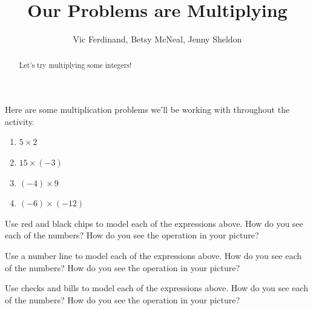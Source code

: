 \documentclass[nooutcomes,noauthor,handout]{ximera}
\title{Our Problems are Multiplying}
\author{Vic Ferdinand, Betsy McNeal, Jenny Sheldon}
\begin{document}
\begin{abstract}
    Let's try multiplying some integers!
\end{abstract}
\maketitle



Here are some multiplication problems we'll be working with throughout the activity.

\begin{enumerate}
    \item $5 \times 2$
    \item $15 \times (-3)$
    \item $(-4) \times 9$
    \item $(-6) \times (-12)$
\end{enumerate}


\begin{problem}
Use red and black chips to model each of the expressions above. How do you see each of the numbers? How do you see the operation in your picture?

\end{problem}



\begin{problem}
Use a number line to model each of the expressions above. How do you see each of the numbers? How do you see the operation in your picture?  
\end{problem}

\begin{problem}
Use checks and bills to model each of the expressions above. How do you see each of the numbers? How do you see the operation in your picture?  
\end{problem}
\end{document}
